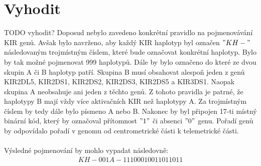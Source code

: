 \documentclass[czech,DP]{thesiskiv}
\numberwithin{equation}{section}
\begin{document}
\begin{landscape}
\begin{center}
\begin{longtable}{l c|| c | c l | c l || c | c l | c l || c | c l | c l }
\end{longtable}
\end{center}
\end{landscape}


\chapter{Vyhodit}
TODO vyhodit?
\noindent
Doposud nebylo zavedeno konkrétní pravidlo na pojmenovávání KIR genů. Avšak bylo navrženo, aby každý KIR haplotyp byl označen $"KH-"$ následovaným trojmístným číslem, které bude označovat konkrétní haplotyp. Bylo by tak možné pojmenovat 999 haplotypů. Dále by bylo označeno do které ze dvou skupin A či B haplotyp patří. Skupina B musí obsahovat alespoň jeden z genů KIR2DL5, KIR2DS1, KIR2DS2, KIR2DS3, KIR2DS5 a KIR3DS1. Naopak skupina A neobsahuje ani jeden z těchto genů. Z tohoto pravidla je patrné, že haplotypy B mají vždy více aktivačních KIR než haplotypy A. Za trojmístným číslem by tedy dále bylo písmeno A nebo B. Nakonec by byl připojen 17-ti místný binární kód, který by označoval přítomnost $"1"$ či absenci $"0"$ genu. Pořadí genů by odpovídalo pořadí v genomu od centrometrické části k telemetrické části. \cite{imgt_hla_database}
\\
\\
Výsledné pojmenování by mohlo vypadat následovně:
\begin{align}
   \label{kir_haplotyp} KH-001A-11100010011011011
\end{align}
\end{document}
